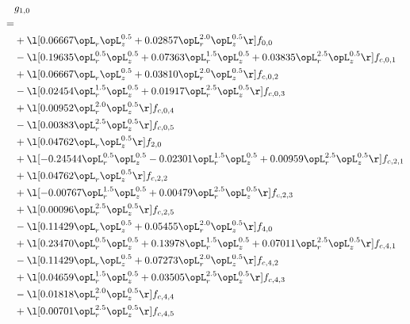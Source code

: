 \begin{alignat}{2} 
\label{eq:g_10_0} 
& g_{1,0} \nonumber \\ 
 = \\ 
& + \l[  0.06667 \opL_r \opL_z^{0.5} +  0.02857 \opL_r^{2.0} \opL_z^{0.5}  \r] f_{0,0} \nonumber \\ 
& - \l[  0.19635 \opL_r^{0.5} \opL_z^{0.5} +  0.07363 \opL_r^{1.5} \opL_z^{0.5} +  0.03835 \opL_r^{2.5} \opL_z^{0.5}  \r] f_{c,0,1} \nonumber \\ 
& + \l[  0.06667 \opL_r \opL_z^{0.5} +  0.03810 \opL_r^{2.0} \opL_z^{0.5}  \r] f_{c,0,2} \nonumber \\ 
& - \l[  0.02454 \opL_r^{1.5} \opL_z^{0.5} +  0.01917 \opL_r^{2.5} \opL_z^{0.5}  \r] f_{c,0,3} \nonumber \\ 
& + \l[  0.00952 \opL_r^{2.0} \opL_z^{0.5}  \r] f_{c,0,4} \nonumber \\ 
& - \l[  0.00383 \opL_r^{2.5} \opL_z^{0.5}  \r] f_{c,0,5} \nonumber \\ 
& + \l[  0.04762 \opL_r \opL_z^{0.5}  \r] f_{2,0} \nonumber \\ 
& + \l[  -0.24544 \opL_r^{0.5} \opL_z^{0.5}   -0.02301 \opL_r^{1.5} \opL_z^{0.5} +  0.00959 \opL_r^{2.5} \opL_z^{0.5}  \r] f_{c,2,1} \nonumber \\ 
& + \l[  0.04762 \opL_r \opL_z^{0.5}  \r] f_{c,2,2} \nonumber \\ 
& + \l[  -0.00767 \opL_r^{1.5} \opL_z^{0.5} +  0.00479 \opL_r^{2.5} \opL_z^{0.5}  \r] f_{c,2,3} \nonumber \\ 
& + \l[  0.00096 \opL_r^{2.5} \opL_z^{0.5}  \r] f_{c,2,5} \nonumber \\ 
& - \l[  0.11429 \opL_r \opL_z^{0.5} +  0.05455 \opL_r^{2.0} \opL_z^{0.5}  \r] f_{4,0} \nonumber \\ 
& + \l[  0.23470 \opL_r^{0.5} \opL_z^{0.5} +  0.13978 \opL_r^{1.5} \opL_z^{0.5} +  0.07011 \opL_r^{2.5} \opL_z^{0.5}  \r] f_{c,4,1} \nonumber \\ 
& - \l[  0.11429 \opL_r \opL_z^{0.5} +  0.07273 \opL_r^{2.0} \opL_z^{0.5}  \r] f_{c,4,2} \nonumber \\ 
& + \l[  0.04659 \opL_r^{1.5} \opL_z^{0.5} +  0.03505 \opL_r^{2.5} \opL_z^{0.5}  \r] f_{c,4,3} \nonumber \\ 
& - \l[  0.01818 \opL_r^{2.0} \opL_z^{0.5}  \r] f_{c,4,4} \nonumber \\ 
& + \l[  0.00701 \opL_r^{2.5} \opL_z^{0.5}  \r] f_{c,4,5} \nonumber \\ 
\end{alignat} 


